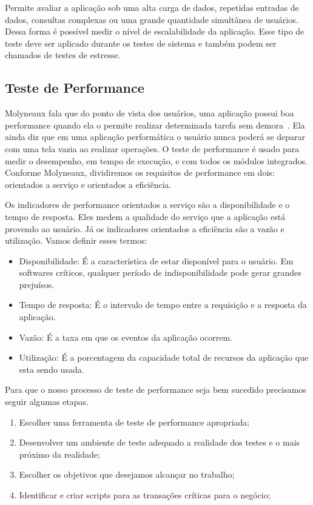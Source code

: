 Permite avaliar a aplicação sob uma alta carga de dados, repetidas entradas de dados, consultas complexas ou uma grande quantidade simultânea de usuários. Dessa forma é possível medir o nível de escalabilidade da aplicação. Esse tipo de teste deve ser aplicado durante os testes de sistema e também podem ser chamados de testes de estresse.


\subsection{Teste de Performance}

Molyneaux fala que do ponto de vista dos usuários, uma aplicação possui boa performance quando ela o permite realizar determinada tarefa sem demora~\cite{theartoftestperf}. Ela ainda diz que em uma aplicação performática o usuário nunca poderá se deparar com uma tela vazia ao realizar operações. O teste de performance é usado para medir o desempenho, em tempo de execução, e com todos os módulos integrados. Conforme Molyneaux, dividiremos os requisitos de performance em dois: orientados a serviço e orientados a eficiência.%

Os indicadores de performance orientados a serviço são a disponibilidade e o tempo de resposta. Eles medem a qualidade do serviço que a aplicação está provendo ao usuário. Já os indicadores orientados a eficiência são a vazão e utilização. Vamos definir esses termos:

\begin{itemize}
\item Disponibilidade: É a característica de estar disponível para o usuário. Em softwares críticos, qualquer período de indisponibilidade pode gerar grandes prejuísos.
\item Tempo de resposta: É o intervalo de tempo entre a requisição e a resposta da aplicação. 
\item Vazão: É a taxa em que os eventos da aplicação ocorrem.
\item Utilização: É a porcentagem da capacidade total de recursos da aplicação que esta sendo usada.
\end{itemize}

Para que o nosso processo de teste de performance seja bem sucedido precisamos seguir algumas etapas.

\begin{enumerate}
\item Escolher uma ferramenta de teste de performance apropriada;
\item Desenvolver um ambiente de teste adequado a realidade dos testes e o mais próximo da realidade;
\item Escolher os objetivos que desejamos alcançar no trabalho;
\item Identificar e criar scripts para as transações críticas para o negócio;
\end{enumerate}


